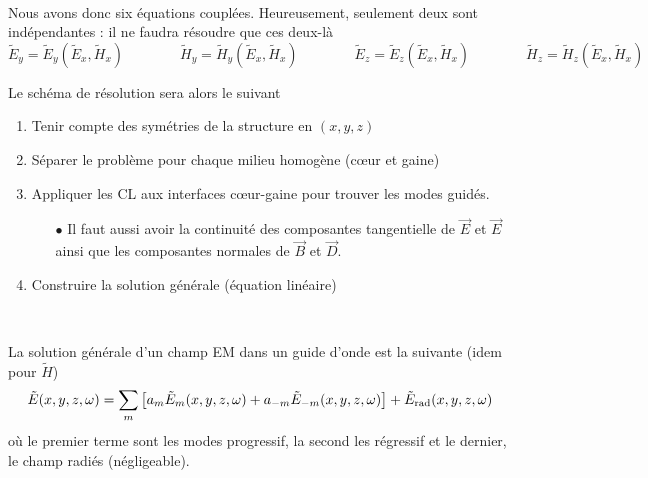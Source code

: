 \ \\

Nous avons donc six équations couplées. Heureusement, seulement deux sont indépendantes : il ne 
faudra résoudre que ces deux-là
\begin{equation}
{\tilde E_y} = {\tilde E_y}({\tilde E_x},{\tilde H_x})\qquad\qquad
{\tilde H_y} = {\tilde H_y}({\tilde E_x},{\tilde H_x})\qquad\qquad
{\tilde E_z} = {\tilde E_z}({\tilde E_x},{\tilde H_x})\qquad\qquad
{\tilde H_z} = {\tilde H_z}({\tilde E_x},{\tilde H_x})
\end{equation}

Le schéma de résolution sera alors le suivant
\begin{enumerate}
\item Tenir compte des symétries de la structure en $(x,y,z)$
\item Séparer le problème pour chaque milieu homogène (cœur et gaine)
\item Appliquer les CL aux interfaces cœur-gaine pour trouver les modes guidés.
\begin{itemize}
\item[$\bullet$] Il faut aussi avoir la continuité des composantes tangentielle de $\vec{E}$ et 
$\vec{E}$ ainsi que les composantes normales de $\vec{B}$ et $\vec{D}$.
\end{itemize}
\item Construire la solution générale (équation linéaire)
\end{enumerate}\ 

La solution générale d'un champ EM dans un guide d'onde est la suivante (idem pour $\tilde{H}$)
\begin{equation}
\tilde E(x,y,z,\omega ) = \sum\limits_m {\left[ {{a_m}{{\tilde E}_m}(x,y,z,\omega ) + {a_{ - m}}{{\tilde E}_{ - m}}(x,y,z,\omega )} \right] + {{\tilde E}_{{\rm{rad}}}}(x,y,z,\omega )} 
\end{equation}
où le premier terme sont les modes progressif, la second les régressif et le dernier, le champ 
radiés (négligeable). 

